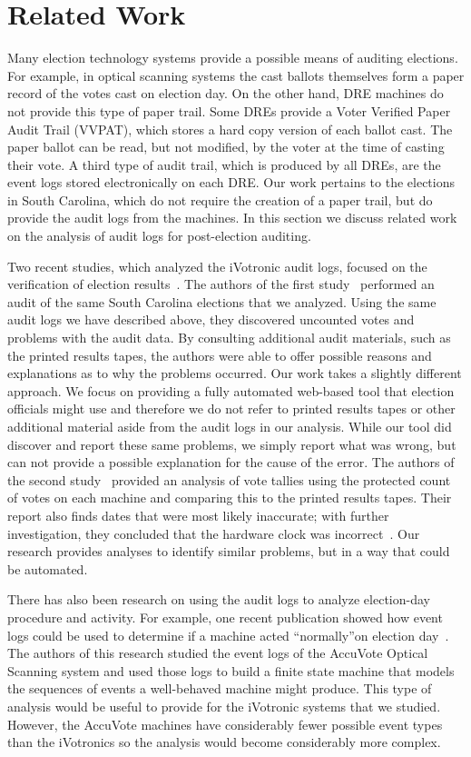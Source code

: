 \section{Related Work}
Many election technology systems provide a possible means of auditing elections. For example, in optical scanning systems the cast ballots themselves form a paper record of the votes cast on election day. On the other hand, DRE machines do not provide this type of paper trail. Some DREs provide a Voter Verified Paper Audit Trail (VVPAT), which stores a hard copy version of each ballot cast. The paper ballot can be read, but not modified, by the voter at the time of casting their vote. A third type of audit trail, which is produced by all DREs, are the event logs stored electronically on each DRE. Our work pertains to the elections in South Carolina, which do not require the creation of a paper trail, but do provide the audit logs from the machines. In this section we discuss related work on the analysis of audit logs for post-election auditing.

Two recent studies, which analyzed the iVotronic audit logs, focused on the verification of election results~\cite{Buell2011,Sandler2007}. The authors of the first study~\cite{Buell2011} performed an audit of the same South Carolina elections that we analyzed. Using the same audit logs we have described above, they discovered uncounted votes and problems with the audit data. By consulting additional audit materials, such as the printed results tapes, the authors were able to offer possible reasons and explanations as to why the problems occurred. Our work takes a slightly different approach. We focus on providing a fully automated web-based tool that election officials might use and therefore we do not refer to printed results tapes or other additional material aside from the audit logs in our analysis. While our tool did discover and report these same problems, we simply report what was wrong, but can not provide a possible explanation for the cause of the error. The authors of the second study~\cite{Sandler2007} provided an analysis of vote tallies using the protected count of votes on each machine and comparing this to the printed results tapes. Their report also finds dates that were most likely inaccurate; with further investigation, they concluded that the hardware clock was incorrect~\cite{Sandler2007}. Our research provides analyses to identify similar problems, but in a way that could be automated.

There has also been research on using the audit logs to analyze election-day procedure and activity. For example, one recent publication showed how event logs could be used to determine if a machine acted \textquotedblleft normally\textquotedblright on election day~\cite{Antonyan2009}. The authors of this research studied the event logs of the AccuVote Optical Scanning system and used those logs to build a finite state machine that models the sequences of events a well-behaved machine might produce. This type of analysis would be useful to provide for the iVotronic systems that we studied. However, the AccuVote machines have considerably fewer possible event types than the iVotronics so the analysis would become considerably more complex.

